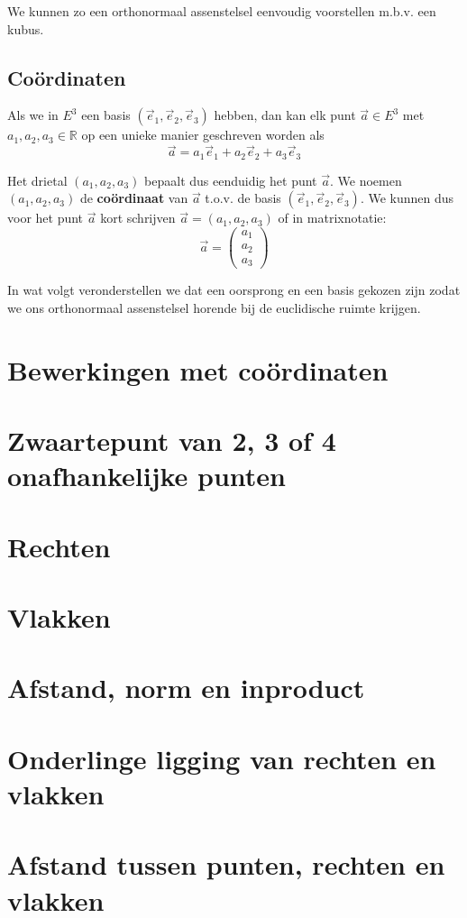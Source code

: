 \documentclass[12pt,twoside]{article}
\begin{document}
We kunnen zo een orthonormaal assenstelsel eenvoudig voorstellen m.b.v. een kubus.

\subsection{Coördinaten}

Als we in $E^3$ een basis $(\vec{e}_1, \vec{e}_2, \vec{e}_3)$ hebben, dan kan elk punt $\vec{a}\in E^3$ met $a_1, a_2, a_3 \in \mathbb{R}$ op een unieke manier geschreven worden als
$$\vec{a} = a_1\vec{e}_1 + a_2\vec{e}_2 + a_3\vec{e}_3$$

Het drietal $(a_1, a_2, a_3)$ bepaalt dus eenduidig het punt $\vec{a}$. We noemen $(a_1, a_2, a_3)$ de {\bf coördinaat} van $\vec{a}$ t.o.v. de basis $(\vec{e}_1, \vec{e}_2, \vec{e}_3)$. We kunnen dus voor het punt $\vec{a}$ kort schrijven $\vec{a}=(a_1, a_2, a_3)$ of in matrixnotatie:
$$\vec{a}=\begin{pmatrix}a_1\\a_2\\a_3\end{pmatrix}$$

In wat volgt veronderstellen we dat een oorsprong en een basis gekozen zijn zodat we ons orthonormaal assenstelsel horende bij de euclidische ruimte krijgen.

\pagebreak
\section{Bewerkingen met coördinaten}

\pagebreak
\section{Zwaartepunt van 2, 3 of 4 onafhankelijke punten}

\pagebreak
\section{Rechten}

\pagebreak
\section{Vlakken}

\pagebreak
\section{Afstand, norm en inproduct}

\pagebreak
\section{Onderlinge ligging van rechten en vlakken}

\pagebreak
\section{Afstand tussen punten, rechten en vlakken}
\end{document}
